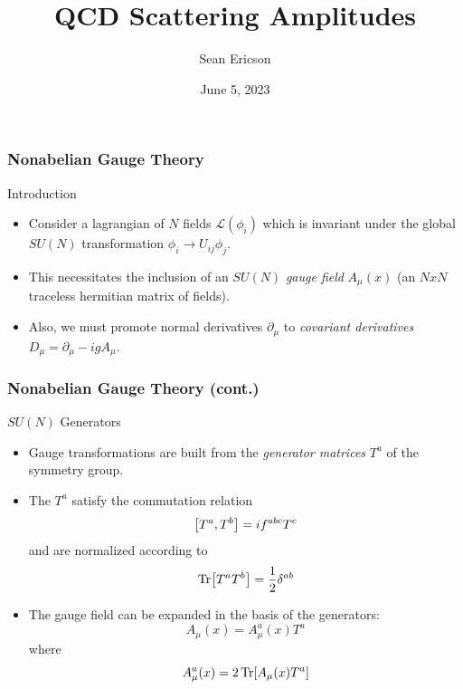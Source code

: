 \documentclass{beamer}
\title{QCD Scattering Amplitudes}
\author{Sean Ericson}
\institute{UO}
\date{June 5, 2023}
\begin{document}
\frame{\titlepage}

\begin{frame}
    \frametitle{Nonabelian Gauge Theory}
    \alert{Introduction}
    \begin{itemize}
        \item[\textbullet]<2-> Consider a lagrangian of $N$ fields $\mathcal{L}(\phi_i)$ which is invariant under the global $SU(N)$ transformation $\phi_i \to U_{ij}\phi_j$.
        \item[\textbullet]<3-> This necessitates the inclusion of an $SU(N)$ \textit{gauge field} $A_\mu(x)$ (an $NxN$ traceless hermitian matrix of fields).
        \item[\textbullet]<4-> Also, we must promote normal derivatives $\partial_\mu$ to \textit{covariant derivatives} $D_\mu = \partial_\mu - igA_\mu$. 
    \end{itemize}
\end{frame}

\begin{frame}
    \frametitle{Nonabelian Gauge Theory (cont.)}
    \alert{$SU(N)$ Generators}
    \begin{itemize}
        \item[\textbullet]<2-> Gauge transformations are built from the \textit{generator matrices} $T^a$ of the symmetry group.
        \item[\textbullet]<3-> The $T^a$ satisfy the commutation relation \[ \comm{T^a}{T^b} = if^{abc}T^c \] and are normalized according to \[ \Tr[T^aT^b] = \frac{1}{2}\delta^{ab} \]
        \item[\textbullet]<4-> The gauge field can be expanded in the basis of the generators: \[ A_\mu(x) = A_\mu^a(x)T^a \] where \[ A_\mu^a(x) = 2\Tr[A_\mu(x)T^a] \]
    \end{itemize}
\end{frame}
\end{document}
